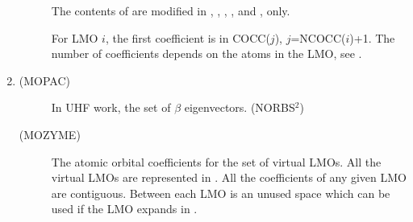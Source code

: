 \begin{enumerate}
\begin{description}
The contents of  are modified in , ,
, , and , only.

For LMO $i$, the first coefficient is in COCC($j$), $j$=NCOCC($i$)+1.  The
number of coefficients depends on the atoms in the LMO, see .
\end{description}
\item 
\begin{description}
\item[(MOPAC) ] In UHF work, the set of $\beta$ eigenvectors.
(NORBS$^2$)
\item[(MOZYME) ] The atomic orbital coefficients for the  set of
virtual LMOs.  All the virtual  LMOs are represented in .  All the
coefficients of any given LMO are contiguous.  Between each LMO is an unused
space which can be used if the LMO expands in .


\end{description}
\end{enumerate}
